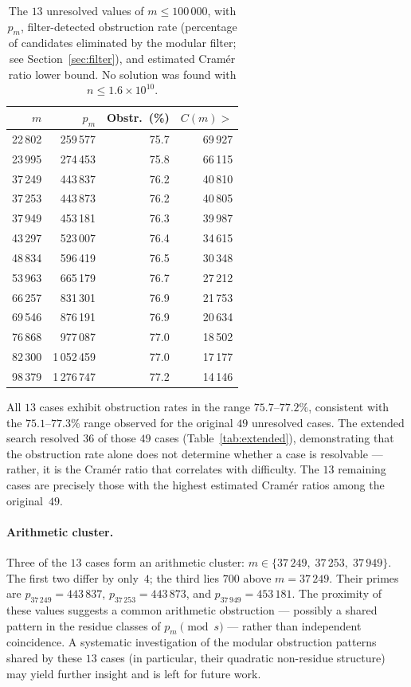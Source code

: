 \documentclass[12pt]{article}
\begin{document}
\begin{table}[ht]
	\centering
	\caption{The $13$ unresolved values of $m \leq 100\,000$, with $p_m$,
		filter-detected obstruction rate (percentage of candidates
		eliminated by the modular filter; see Section~\ref{sec:filter}),
		and estimated Cram\'er ratio lower bound.
		No solution was found with $n \leq 1.6 \times 10^{10}$.}
	\label{tab:notfound}
	\small
	\begin{tabular}{rrrr}
		\toprule
		$m$ & $p_m$ & Obstr.\ (\%) & $C(m) >$ \\
		\midrule
		22\,802 &  259\,577 & 75.7 & 69\,927 \\
		23\,995 &  274\,453 & 75.8 & 66\,115 \\
		37\,249 &  443\,837 & 76.2 & 40\,810 \\
		37\,253 &  443\,873 & 76.2 & 40\,805 \\
		37\,949 &  453\,181 & 76.3 & 39\,987 \\
		43\,297 &  523\,007 & 76.4 & 34\,615 \\
		48\,834 &  596\,419 & 76.5 & 30\,348 \\
		53\,963 &  665\,179 & 76.7 & 27\,212 \\
		66\,257 &  831\,301 & 76.9 & 21\,753 \\
		69\,546 &  876\,191 & 76.9 & 20\,634 \\
		76\,868 &  977\,087 & 77.0 & 18\,502 \\
		82\,300 & 1\,052\,459 & 77.0 & 17\,177 \\
		98\,379 & 1\,276\,747 & 77.2 & 14\,146 \\
		\bottomrule
	\end{tabular}
\end{table}

All $13$ cases exhibit obstruction rates in the range $75.7$--$77.2\%$,
consistent with the $75.1$--$77.3\%$ range observed for the original
$49$ unresolved cases.
The extended search resolved $36$ of those $49$ cases
(Table~\ref{tab:extended}), demonstrating that the obstruction rate
alone does not determine whether a case is resolvable --- rather, it is
the Cram\'er ratio that correlates with difficulty.
The $13$ remaining cases are precisely those with the highest estimated
Cram\'er ratios among the original~$49$.

\paragraph{Arithmetic cluster.}
Three of the $13$ cases form an arithmetic cluster:
$m \in \{37\,249,\; 37\,253,\; 37\,949\}$.
The first two differ by only~$4$; the third lies $700$ above
$m = 37\,249$.
Their primes are $p_{37\,249} = 443\,837$,
$p_{37\,253} = 443\,873$, and $p_{37\,949} = 453\,181$.
The proximity of these values suggests a common arithmetic obstruction
--- possibly a shared pattern in the residue classes of $p_m \pmod{s}$
--- rather than independent coincidence.
A systematic investigation of the modular obstruction patterns shared by
these $13$ cases (in particular, their quadratic non-residue structure)
may yield further insight and is left for future work.
\end{document}
